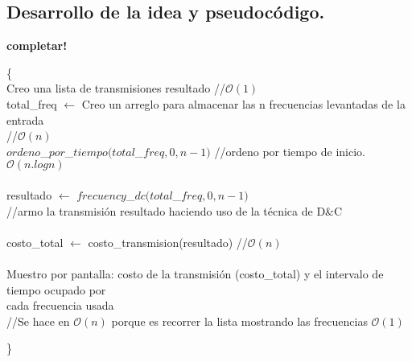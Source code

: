 


\newpage
\subsection{Desarrollo de la idea y pseudocódigo.}

\vspace*{0.3cm}

\textbf{completar!}

\begin{codebox}
 \{\\
 Creo una lista de transmisiones resultado  //$\mathcal{O}(1)$ \\
 total_freq $\longleftarrow$ Creo un arreglo para almacenar las n frecuencias levantadas de la entrada\\  //$\mathcal{O}(n)$
 \\
 $ordeno$_$por$_$tiempo(total$_$freq,0,n-1)$ //ordeno por tiempo de inicio. $\mathcal{O}(n.logn)$
 \\
 \\
 resultado $\longleftarrow$ $frecuency$_$dc(total$_$freq,0,n-1)$
 \\//armo la transmisión resultado haciendo uso de la técnica de D\&C
 \\
 \\
 costo_total $\longleftarrow$ costo_transmision(resultado) //$\mathcal{O}(n)$
 \\
 \\
 Muestro por pantalla: costo de la transmisión (costo_total) y el intervalo de tiempo ocupado por \\ cada frecuencia usada
 \\
 //Se hace en $\mathcal{O}(n)$ porque es recorrer la lista mostrando las frecuencias $\mathcal{O}(1)$

\end{codebox}
\}
\\
\\
